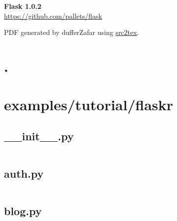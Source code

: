 \documentclass{article}
\begin{document}

\title{}
\author{Shadab Zafar}

\begin{titlepage}
   \begin{center}
    \Huge
    \textbf{Flask 1.0.2} \\


    \LARGE
    \href{https://github.com/pallets/flask}{https://github.com/pallets/flask}


    \large
    PDF generated by dufferZafar using \href{http://github.com/dufferzafar/src2tex}{src2tex}.
   \end{center}
\end{titlepage}

\newpage

\tableofcontents
\newpage



\section{.}

\section{examples/tutorial/flaskr}

\subsection{\_\_init\_\_.py}
\inputminted{python}{/tmp/flask/examples/tutorial/flaskr/__init__.py}
\newpage

\subsection{auth.py}
\inputminted{python}{/tmp/flask/examples/tutorial/flaskr/auth.py}
\newpage

\subsection{blog.py}
\inputminted{python}{/tmp/flask/examples/tutorial/flaskr/blog.py}
\newpage
\end{document}
